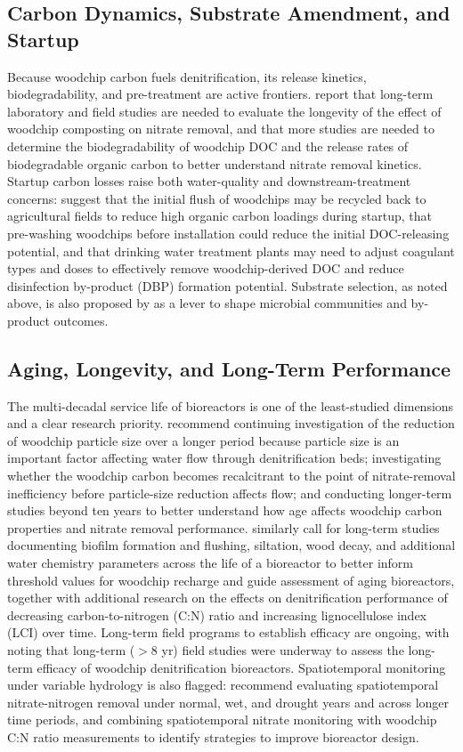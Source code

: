 \documentclass[11pt]{article}
\begin{document}
\subsection{Carbon Dynamics, Substrate Amendment, and Startup}
Because woodchip carbon fuels denitrification, its release kinetics, biodegradability, and pre-treatment are active frontiers. \textcite{Kouanda2021} report that long-term laboratory and field studies are needed to evaluate the longevity of the effect of woodchip composting on nitrate removal, and that more studies are needed to determine the biodegradability of woodchip DOC and the release rates of biodegradable organic carbon to better understand nitrate removal kinetics. Startup carbon losses raise both water-quality and downstream-treatment concerns: \textcite{Abusallout2017} suggest that the initial flush of woodchips may be recycled back to agricultural fields to reduce high organic carbon loadings during startup, that pre-washing woodchips before installation could reduce the initial DOC-releasing potential, and that drinking water treatment plants may need to adjust coagulant types and doses to effectively remove woodchip-derived DOC and reduce disinfection by-product (DBP) formation potential. Substrate selection, as noted above, is also proposed by \textcite{Hartfiel2022} as a lever to shape microbial communities and by-product outcomes.

\subsection{Aging, Longevity, and Long-Term Performance}
The multi-decadal service life of bioreactors is one of the least-studied dimensions and a clear research priority. \textcite{Ghane2018} recommend continuing investigation of the reduction of woodchip particle size over a longer period because particle size is an important factor affecting water flow through denitrification beds; investigating whether the woodchip carbon becomes recalcitrant to the point of nitrate-removal inefficiency before particle-size reduction affects flow; and conducting longer-term studies beyond ten years to better understand how age affects woodchip carbon properties and nitrate removal performance. \textcite{Christianson2020} similarly call for long-term studies documenting biofilm formation and flushing, siltation, wood decay, and additional water chemistry parameters across the life of a bioreactor to better inform threshold values for woodchip recharge and guide assessment of aging bioreactors, together with additional research on the effects on denitrification performance of decreasing carbon-to-nitrogen (C:N) ratio and increasing lignocellulose index (LCI) over time. Long-term field programs to establish efficacy are ongoing, with \textcite{Greenan2009} noting that long-term ($>$8 yr) field studies were underway to assess the long-term efficacy of woodchip denitrification bioreactors. Spatiotemporal monitoring under variable hydrology is also flagged: \textcite{Hartfiel2023b} recommend evaluating spatiotemporal nitrate-nitrogen removal under normal, wet, and drought years and across longer time periods, and combining spatiotemporal nitrate monitoring with woodchip C:N ratio measurements to identify strategies to improve bioreactor design.
\end{document}
